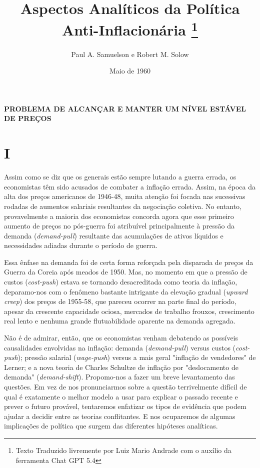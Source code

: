 \documentclass[12pt]{article}
\title{Aspectos Analíticos da Política Anti-Inflacionária \thanks{Texto Traduzido livremente por Luiz Mario Andrade com o auxílio da ferramenta Chat GPT 5.4}}
\author{Paul A. Samuelson e Robert M. Solow}
\date{Maio de 1960}
\begin{document}
\maketitle

\begin{center}
    \textbf{PROBLEMA DE ALCANÇAR E MANTER UM NÍVEL ESTÁVEL DE PREÇOS}
\end{center}

\section*{I}

Assim como se diz que os generais estão sempre lutando a guerra errada, os economistas têm sido acusados de combater a inflação errada. Assim, na época da alta dos preços americanos de 1946-48, muita atenção foi focada nas sucessivas rodadas de aumentos salariais resultantes da negociação coletiva. No entanto, provavelmente a maioria dos economistas concorda agora que esse primeiro aumento de preços no pós-guerra foi atribuível principalmente à pressão da demanda (\textit{demand-pull}) resultante das acumulações de ativos líquidos e necessidades adiadas durante o período de guerra.

Essa ênfase na demanda foi de certa forma reforçada pela disparada de preços da Guerra da Coreia após meados de 1950. Mas, no momento em que a pressão de custos (\textit{cost-push}) estava se tornando desacreditada como teoria da inflação, deparamo-nos com o fenômeno bastante intrigante da elevação gradual (\textit{upward creep}) dos preços de 1955-58, que pareceu ocorrer na parte final do período, apesar da crescente capacidade ociosa, mercados de trabalho frouxos, crescimento real lento e nenhuma grande flutuabilidade aparente na demanda agregada.

Não é de admirar, então, que os economistas venham debatendo as possíveis causalidades envolvidas na inflação: demanda (\textit{demand-pull}) versus custos (\textit{cost-push}); pressão salarial (\textit{wage-push}) versus a mais geral "inflação de vendedores" de Lerner; e a nova teoria de Charles Schultze de inflação por "deslocamento de demanda" (\textit{demand-shift}). Propomo-nos a fazer um breve levantamento das questões. Em vez de nos pronunciarmos sobre a questão terrivelmente difícil de qual é exatamente o melhor modelo a usar para explicar o passado recente e prever o futuro provável, tentaremos enfatizar os tipos de evidência que podem ajudar a decidir entre as teorias conflitantes. E nos ocuparemos de algumas implicações de política que surgem das diferentes hipóteses analíticas.
\end{document}
